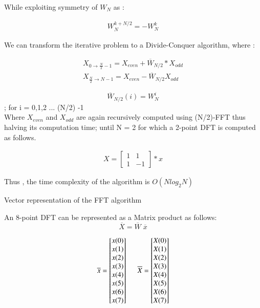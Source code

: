 \documentclass[journal,12pt,twocolumn]{IEEEtran}
\begin{document}
While exploiting symmetry of $W_{N}$ as :

\begin{align}
  W_{N}^{k+N/2} = -W_{N}^k  
\end{align}

We can transform the iterative problem to a Divide-Conquer algorithm, where : 

\begin{align}
    X_{0\rightarrow \frac{N}{2}-1} = X_{even} + \overline{W}_{N/2}* X_{odd} \\
    X_{\frac{N}{2}\rightarrow N-1} = X_{even} - \overline{W}_{N/2} X_{odd} 
\end{align}

 $$\overline{W}_{N/2}(i) = W_{N}^i $$;  for i = 0,1,2 ... (N/2) -1 \bigskip\\
 
 Where $ X_{even}$ and $X_{odd}$ are again recursively computed using (N/2)-FFT thus halving its computation time;
until N = 2  for which a 2-point DFT is computed as follows.

\begin{align}
    X = 
    \begin{bmatrix}
    1 & 1\\
    1& -1
    \end{bmatrix} * x
\end{align}

Thus , the time complexity of the algorithm is $O(Nlog_{2}N)$\bigskip

Vector representation of the FFT algorithm

An 8-point DFT can be represented as a Matrix product as follows:
$$\overline{X} = \overline{W}\;  \overline{x}$$

\begin{equation}
  \overline{x} =
\begin{bmatrix}
x(0) \\ x(1) \\ x(2) \\ x(3) \\ x(4) \\ x(5) \\x(6) \\x(7)
\end{bmatrix}  \hspace{5mm} \overline{X} =
\begin{bmatrix}
X(0) \\X(1) \\X(2) \\X(3) \\X(4) \\X(5) \\X(6) \\X(7) \\
\end{bmatrix} 
\end{equation}
\end{document}
